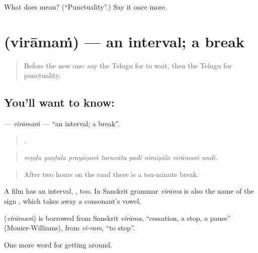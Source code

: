 \begin{tcolorbox}[breakable,colback=teal!4,colframe=teal!35!black,title={Before you move on}]
What does  mean? (\textquotedblleft{}Punctuality\textquotedblright{}.) Say it once more.
\end{tcolorbox}
\section[\texorpdfstring{\te{విరామం} (virāmaṁ)}{విరామం (virāmaṁ)}]{ (virāmaṁ) — an interval; a break}

\label{lesson:TE-C440-viramam}



\begin{quote}
Before the new one: say the Telugu for to wait, then the Telugu for punctuality.
\end{quote}

\subsection*{You'll want to know: }
\textbf{} — \emph{virāmaṁ} — \textquotedblleft{}an interval; a break\textquotedblright{}.

\begin{quote}
       .
\end{quote}

\begin{quote}
\emph{reṇḍu gaṇṭala prayāṇaṁ taruvāta padi nimiṣāla virāmaṁ undi.}
\end{quote}

\begin{quote}
After two hours on the road there is a ten-minute break.
\end{quote}

A film has an interval, , too. In Sanskrit grammar \emph{virāma} is also the name of the sign , which takes away a consonant's vowel.

\begin{cousinweb}
\textbf{} (\emph{virāmaṁ}) is borrowed from Sanskrit \emph{virāma}, \textquotedblleft{}cessation, a stop, a pause\textquotedblright{} (Monier-Williams), from \emph{vi-ram}, \textquotedblleft{}to stop\textquotedblright{}.
\end{cousinweb}

\begin{grammarlens}[title={What you've built}]
One more word for getting around.
\end{grammarlens}

